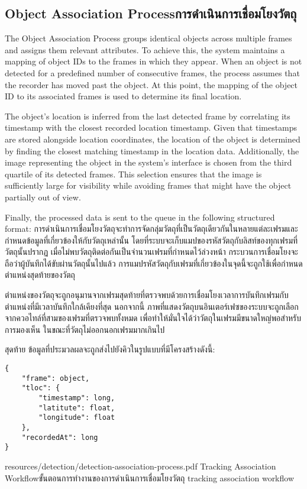 \subsection{\ifenglish Object Association Process\else การดำเนินการเชื่อมโยงวัตถุ\fi}
\ifenglish
The Object Association Process groups identical objects across multiple frames and assigns them relevant attributes. To achieve this, the system maintains a mapping of object IDs to the frames in which they appear. When an object is not detected for a predefined number of consecutive frames, the process assumes that the recorder has moved past the object. At this point, the mapping of the object ID to its associated frames is used to determine its final location.

The object's location is inferred from the last detected frame by correlating its timestamp with the closest recorded location timestamp. Given that timestamps are stored alongside location coordinates, the location of the object is determined by finding the closest matching timestamp in the location data. Additionally, the image representing the object in the system's interface is chosen from the third quartile of its detected frames. This selection ensures that the image is sufficiently large for visibility while avoiding frames that might have the object partially out of view.

Finally, the processed data is sent to the queue in the following structured format:
\else
การดำเนินการเชื่อมโยงวัตถุจะทำการจัดกลุ่มวัตถุที่เป็นวัตถุเดียวกันในหลายแต่ละเฟรมและกำหนดข้อมูลที่เกี่ยวข้องให้กับวัตถุเหล่านั้น โดยที่ระบบจะเก็บแมปของรหัสวัตถุกับลิสท์ของทุกเฟรมที่วัตถุนั้นปรากฏ เมื่อไม่พบวัตถุติดต่อกันเป็นจำนวนเฟรมที่กำหนดไว้ล่วงหน้า กระบวนการเชื่อมโยงจะถือว่าผู้บันทึกได้ขับผ่านวัตถุนั้นไปแล้ว การแมปรหัสวัตถุกับเฟรมที่เกี่ยวข้องในจุดนี้จะถูกใช้เพื่อกำหนดตำแหน่งสุดท้ายของวัตถุ

ตำแหน่งของวัตถุจะถูกอนุมานจากเฟรมสุดท้ายที่ตรวจพบด้วยการเชื่อมโยงเวลาการบันทึกเฟรมกับตำแหน่งที่มีเวลาบันทึกใกล้เคียงที่สุด นอกจากนี้ ภาพที่แสดงวัตถุบนอินเตอร์เฟซของระบบจะถูกเลือกจากควอไทล์ที่สามของเฟรมที่ตรวจพบทั้งหมด เพื่อทำให้มั่นใจได้ว่าวัตถุในเฟรมมีขนาดใหญ่พอสำหรับการมองเห็น ในขณะที่วัตถุไม่ออกนอกเฟรมมากเกินไป

สุดท้าย ข้อมูลที่ประมวลผลจะถูกส่งไปยังคิวในรูปแบบที่มีโครงสร้างดังนี้:
\fi
\begin{lstlisting}
{
    "frame": object,
    "tloc": {
        "timestamp": long,
        "latitute": float,
        "longitude": float
    },
    "recordedAt": long
}
\end{lstlisting}

\insertPDFfigure
{resources/detection/detection-association-process.pdf}
{\ifenglish Tracking Association Workflow\else ขั้นตอนการทำงานของการดำเนินการเชื่อมโยงวัตถุ\fi}
{tracking association workflow}